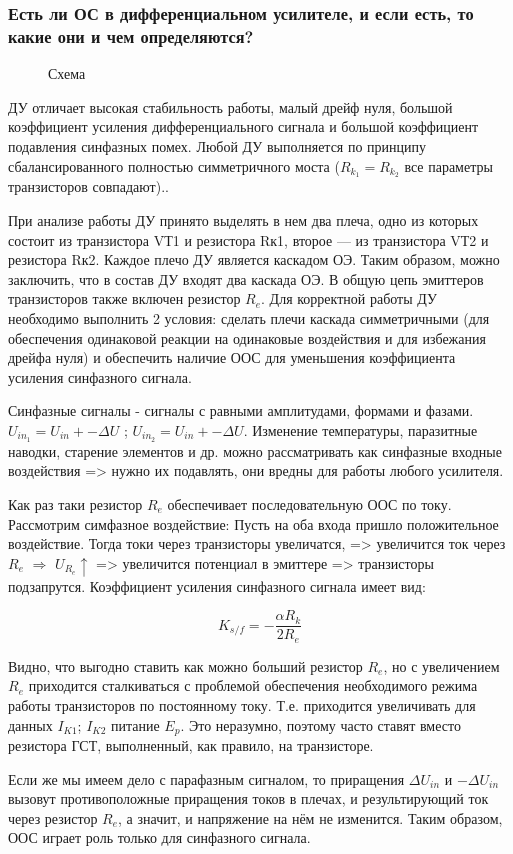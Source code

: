 \subsubsection{Есть ли ОС в дифференциальном усилителе, и если есть, то какие они и чем определяются?}

\begin{center}
	\begin{figure}[h!]
		\caption{Схема}
	\end{figure}
\end{center} 
ДУ отличает высокая стабильность работы, малый дрейф нуля, большой коэффициент усиления дифференциального сигнала и большой коэффициент подавления синфазных помех.
Любой ДУ выполняется по принципу сбалансированного полностью симметричного моста ($R_{k_1} = R_{k_2}$ все параметры транзисторов совпадают).. 

При анализе работы ДУ принято выделять в нем два плеча, одно из которых состоит из транзистора VТ1 и резистора Rк1, второе  — из транзистора VТ2 и резистора Rк2. Каждое плечо ДУ является каскадом ОЭ. Таким образом, можно заключить, что в состав ДУ входят два каскада ОЭ. В общую цепь эмиттеров транзисторов также включен резистор $R_e$. Для корректной работы ДУ необходимо выполнить 2 условия: сделать плечи каскада симметричными (для обеспечения одинаковой реакции на одинаковые воздействия и для избежания дрейфа нуля) и обеспечить наличие ООС для уменьшения коэффициента усиления синфазного сигнала.

Синфазные сигналы  - сигналы с равными амплитудами, формами и фазами. $U_{in_1} = U_{in} +- \Delta U$ ; $U_{in_2} = U_{in} +- \Delta U$. Изменение температуры, паразитные наводки, старение элементов и др. можно рассматривать как синфазные входные воздействия => нужно их подавлять, они вредны для работы любого усилителя.

Как раз таки резистор $R_e$ обеспечивает последовательную ООС по току. Рассмотрим симфазное воздействие: Пусть на оба входа пришло положительное воздействие. Тогда токи через транзисторы увеличатся, => увеличится ток через $R_e$ $\Rightarrow$ $U_{R_e} \uparrow$ => увеличится потенциал в эмиттере => транзисторы подзапрутся. Коэффициент усиления синфазного сигнала имеет вид:

$$
K_{s/f} = -\frac{\alpha R_k}{2R_e}
$$

Видно, что выгодно ставить как можно больший резистор $R_e$, но с увеличением $R_e$ приходится сталкиваться с проблемой обеспечения необходимого режима работы транзисторов по постоянному току. Т.е. приходится увеличивать для данных $I_{K1}$; $I_{K2}$ питание $E_p$. Это неразумно, поэтому часто ставят вместо резистора ГСТ, выполненный, как правило, на транзисторе.

Если же мы имеем дело с парафазным сигналом, то приращения $\Delta U_{in}$ и $-\Delta U_{in}$ вызовут противоположные приращения токов в плечах, и результирующий ток через резистор $R_e$, а значит, и напряжение на нём не изменится. Таким образом, ООС играет роль только для синфазного сигнала. 

\pagebreak

